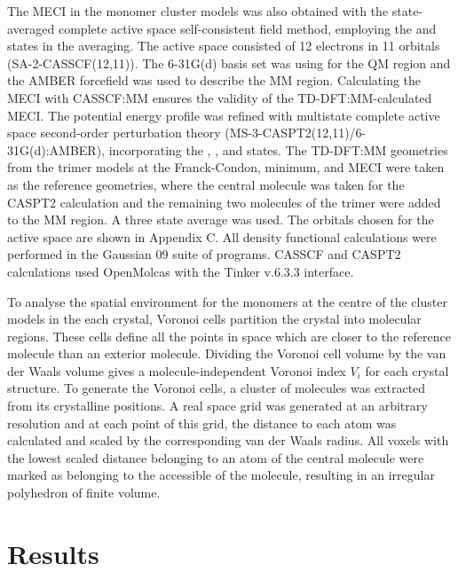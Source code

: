 The MECI in the monomer cluster models was also obtained with the state-averaged complete active space self-consistent field method, employing the \szero{} and \sone{} states in the averaging. The active space consisted of 12 electrons in 11 orbitals (SA-2-CASSCF(12,11)). The 6-31G(d) basis set was using for the QM region and the AMBER forcefield was used to describe the MM region. Calculating the MECI with CASSCF:MM ensures the validity of the TD-DFT:MM-calculated MECI. The potential energy profile was refined with multistate complete active space second-order perturbation theory (MS-3-CASPT2(12,11)/6-31G(d):AMBER), incorporating the \szero{}, \sone{}, and \stwo{} states. The TD-DFT:MM geometries from the trimer models at the Franck-Condon, \sone{} minimum, and MECI were taken as the reference geometries, where the central molecule was taken for the CASPT2 calculation and the remaining two molecules of the trimer were added to the MM region.  A three state average was used. The orbitals chosen for the active space are shown in Appendix C. All density functional calculations were performed in the Gaussian 09 suite of programs.\cite{g09} CASSCF and CASPT2 calculations used OpenMolcas with the Tinker v.6.3.3 interface.\cite{Aquilante2016}

To analyse the spatial environment for the monomers at the centre of the cluster models in the each crystal, Voronoi cells partition the crystal into molecular regions. These cells define all the points in space which are closer to the reference molecule than an exterior molecule. Dividing the Voronoi cell volume by the van der Waals volume gives a molecule-independent Voronoi index $V_{i}$ for each crystal structure. To generate the Voronoi cells, a cluster of molecules was extracted from its crystalline positions. A real space grid was generated at an arbitrary resolution and at each point of this grid, the distance to each atom was calculated and scaled by the corresponding van der Waals radius. All voxels with the lowest scaled distance belonging to an atom of the central molecule were marked as belonging to the accessible of the molecule, resulting in an irregular polyhedron of finite volume. 
\section{Results}\label{section: Connecting_Results}
